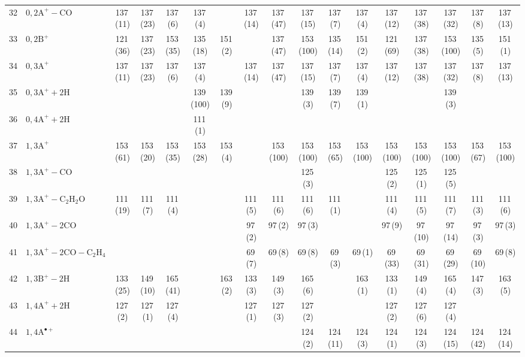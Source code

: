 \documentclass[]{article}
\begin{document}
\begin{table}
{\begin{tabular}{ll|ccccc|ccccc|ccccc}
  32 & $\mathrm{0{,}2A^+{-}CO}$ & 137\,(11) & 137\,(23) & 137\,(6) & 137\,(4) &  & 137\,(14) & 137\,(47) & 137\,(15) & 137\,(7) & 137\,(4) & 137\,(12) & 137\,(38) & 137\,(32) & 137\,(8) & 137\,(13) \\ 
  33 & $\mathrm{0{,}2B^+}$ & 121\,(36) & 137\,(23) & 153\,(35) & 135\,(18) & 151\,(2) &  & 137\,(47) & 153\,(100) & 135\,(14) & 151\,(2) & 121\,(69) & 137\,(38) & 153\,(100) & 135\,(5) & 151\,(1) \\ 
  34 & $\mathrm{0{,}3A^+}$ & 137\,(11) & 137\,(23) & 137\,(6) & 137\,(4) &  & 137\,(14) & 137\,(47) & 137\,(15) & 137\,(7) & 137\,(4) & 137\,(12) & 137\,(38) & 137\,(32) & 137\,(8) & 137\,(13) \\ 
  35 & $\mathrm{0{,}3A^+{+}2H}$ &  &  &  & 139\,(100) & 139\,(9) &  &  & 139\,(3) & 139\,(7) & 139\,(1) &  &  & 139\,(3) &  &  \\ 
  36 & $\mathrm{0{,}4A^+{+}2H}$ &  &  &  & 111\,(1) &  &  &  &  &  &  &  &  &  &  &  \\ 
  37 & $\mathrm{1{,}3A^+}$ & 153\,(61) & 153\,(20) & 153\,(35) & 153\,(28) & 153\,(4) &  & 153\,(100) & 153\,(100) & 153\,(65) & 153\,(100) & 153\,(100) & 153\,(100) & 153\,(100) & 153\,(67) & 153\,(100) \\ 
  38 & $\mathrm{1{,}3A^+{-}CO}$ &  &  &  &  &  &  &  & 125\,(3) &  &  & 125\,(2) & 125\,(1) & 125\,(5) &  &  \\ 
  39 & $\mathrm{1{,}3A^+{-}C_{2}H_{2}O}$ & 111\,(19) & 111\,(7) & 111\,(4) &  &  & 111\,(5) & 111\,(6) & 111\,(6) & 111\,(1) &  & 111\,(4) & 111\,(5) & 111\,(7) & 111\,(3) & 111\,(6) \\ 
  40 & $\mathrm{1{,}3A^+{-}2CO}$ &  &  &  &  &  & 97\,(2) & 97\,(2) & 97\,(3) &  &  & 97\,(9) & 97\,(10) & 97\,(14) & 97\,(3) & 97\,(3) \\ 
  41 & $\mathrm{1{,}3A^+{-}2CO{-}C_{2}H_{4}}$ &  &  &  &  &  & 69\,(7) & 69\,(8) & 69\,(8) & 69\,(3) & 69\,(1) & 69\,(33) & 69\,(31) & 69\,(29) & 69\,(10) & 69\,(8) \\ 
  42 & $\mathrm{1{,}3B^+{-}2H}$ & 133\,(25) & 149\,(10) & 165\,(41) &  & 163\,(2) & 133\,(3) & 149\,(3) & 165\,(6) &  & 163\,(1) & 133\,(1) & 149\,(4) & 165\,(4) & 147\,(3) & 163\,(5) \\ 
  43 & $\mathrm{1{,}4A^+{+}2H}$ & 127\,(2) & 127\,(1) & 127\,(4) &  &  & 127\,(1) & 127\,(3) & 127\,(2) &  &  & 127\,(2) & 127\,(6) & 127\,(4) &  &  \\ 
  44 & $\mathrm{1{,}4A^{\bullet+}}$ &  &  &  &  &  &  &  & 124\,(2) & 124\,(11) & 124\,(3) & 124\,(1) & 124\,(3) & 124\,(15) & 124\,(42) & 124\,(14) \\ 

\end{tabular}}
\end{table}
\end{document}
